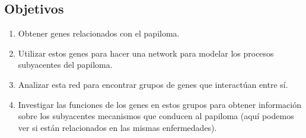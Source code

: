 \subsection{Objetivos}
\vspace{3pt}
\begin{enumerate}
	\item Obtener genes relacionados con el papiloma.
	\item Utilizar estos genes para hacer una network para modelar los procesos subyacentes del papiloma.
	\item Analizar esta red para encontrar grupos de genes que interactúan entre sí.
	\item Investigar las funciones de los genes en estos grupos para obtener información sobre los subyacentes mecanismos que conducen al papiloma (aquí podemos ver si están relacionados en las mismas enfermedades).
	
\end{enumerate}
